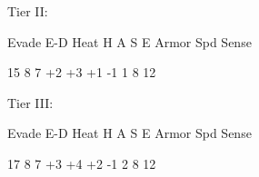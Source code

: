 Tier II:
 

          Evade     E-D    Heat    H    A     S     E       Armor        Spd       Sense 

          15       8       7       +2   +3    +1    -1      1            8         12 

                                                                                                                


Tier III:
 

         Evade     E-D   Heat    H    A     S     E      Armor        Spd      Sense 

          17       8     7       +3   +4    +2   -1      2            8        12 
